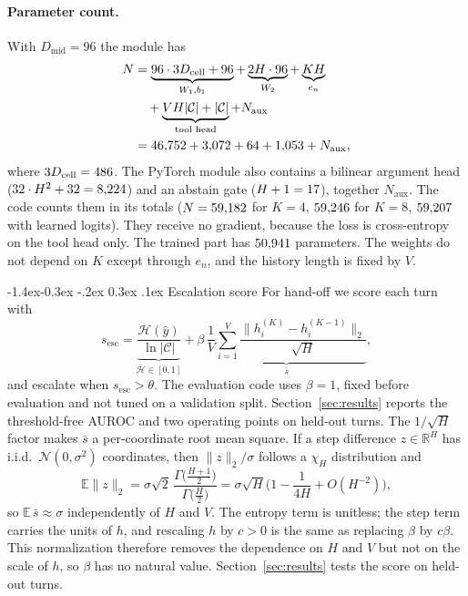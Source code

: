 \documentclass[10pt,twocolumn,letterpaper]{article}
\makeatletter
\renewcommand\subsection{\@startsection{subsection}{2}{\z@}%
  {-1.4ex\@plus -0.3ex \@minus -.2ex}%
  {0.3ex \@plus .1ex}%
  {\normalfont\normalsize\bfseries}}
\makeatother
\begin{document}
\paragraph{Parameter count.} With $D_{\text{mid}}{=}96$ the module has
\begin{equation}\label{eq:params}
\begin{aligned}
N &= \underbrace{96\cdot 3D_{\text{cell}} + 96}_{W_1,b_1} + \underbrace{2H\cdot 96}_{W_2} + \underbrace{KH}_{e_n} \\ &\quad + \underbrace{VH|\mathcal{C}| + |\mathcal{C}|}_{\text{tool head}} + N_{\text{aux}} \\
&= 46{,}752 + 3{,}072 + 64 + 1{,}053 + N_{\text{aux}} ,
\end{aligned}
\end{equation}
where $3D_{\text{cell}} = 486$. The PyTorch module also contains a bilinear argument head ($32\cdot H^2 + 32 = 8{,}224$) and an abstain gate ($H+1 = 17$), together $N_{\text{aux}}$. The code counts them in its totals ($N = 59{,}182$ for $K{=}4$, $59{,}246$ for $K{=}8$, $59{,}207$ with learned logits). They receive no gradient, because the loss is cross-entropy on the tool head only. The trained part has $50{,}941$ parameters. The weights do not depend on $K$ except through $e_n$, and the history length is fixed by $V$.

\subsection{Escalation score}\label{sec:escalation}
For hand-off we score each turn with
\begin{equation}\label{eq:escalate}
s_{\text{esc}} = \underbrace{\frac{\mathcal{H}(\hat y)}{\ln|\mathcal{C}|}}_{\bar{\mathcal H}\in[0,1]} + \beta\, \underbrace{\frac{1}{V}\sum_{i=1}^{V}\frac{\|h_i^{(K)}-h_i^{(K-1)}\|_2}{\sqrt{H}}}_{\bar s},
\end{equation}
and escalate when $s_{\text{esc}} > \theta$. The evaluation code uses $\beta{=}1$, fixed before evaluation and not tuned on a validation split. Section~\ref{sec:results} reports the threshold-free AUROC and two operating points on held-out turns. The $1/\sqrt{H}$ factor makes $\bar s$ a per-coordinate root mean square. If a step difference $z\in\mathbb{R}^H$ has i.i.d.\ $\mathcal{N}(0,\sigma^2)$ coordinates, then $\|z\|_2/\sigma$ follows a $\chi_H$ distribution and
\begin{equation}
\mathbb{E}\|z\|_2 = \sigma\sqrt{2}\,\frac{\Gamma\!\big(\tfrac{H+1}{2}\big)}{\Gamma\!\big(\tfrac{H}{2}\big)} = \sigma\sqrt{H}\Big(1 - \frac{1}{4H} + O(H^{-2})\Big),
\end{equation}
so $\mathbb{E}\,\bar s \approx \sigma$ independently of $H$ and $V$. The entropy term is unitless; the step term carries the units of $h$, and rescaling $h$ by $c>0$ is the same as replacing $\beta$ by $c\beta$. This normalization therefore removes the dependence on $H$ and $V$ but not on the scale of $h$, so $\beta$ has no natural value. Section~\ref{sec:results} tests the score on held-out turns.
\end{document}
